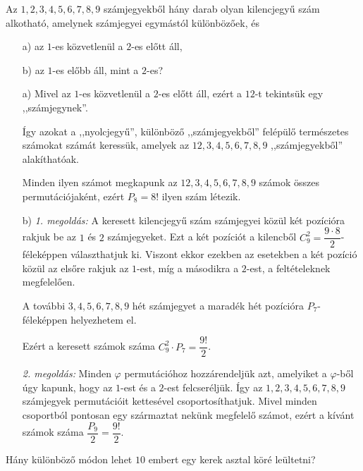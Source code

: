\begin{problem}
\label{fel11} Az $1,2,3,4,5,6,7,8,9$ számjegyekből hány darab olyan
kilencjegyű szám alkotható, amelynek számjegyei egymástól különbözőek,
és 
\begin{enumerate}
\item[a)] az $1$-es közvetlenül a $2$-es előtt áll, 
\item[b)] az $1$-es előbb áll, mint a $2$-es? 
\item[a)] Mivel az $1$-es közvetlenül a $2$-es előtt áll, ezért a $12$-t
tekintsük egy ,,számjegynek''.

Így azokat a ,,nyolcjegyű'', különböző ,,számjegyekből'' felépülő
természetes számokat számát keressük, amelyek az $12,3,4,5,6,7,8,9$
,,számjegyekből'' alakíthatóak.

Minden ilyen számot megkapunk az $12,3,4,5,6,7,8,9$ számok összes
permutációjaként, ezért $P_{8}=8!$ ilyen szám létezik.
\item[b)] \textit{1. megoldás:} A keresett kilencjegyű szám számjegyei közül
két pozícióra rakjuk be az $1$ és $2$ számjegyeket. Ezt a két pozíciót
a kilencből $C_{9}^{2}=\dfrac{9\cdot8}{2}$-féleképpen választhatjuk
ki. Viszont ekkor ezekben az esetekben a két pozíció közül az elsőre
rakjuk az $1$-est, míg a másodikra a $2$-est, a feltételeknek megfelelően.

A további $3,4,5,6,7,8,9$ hét számjegyet a maradék hét pozícióra
$P_{7}$-féleképpen helyezhetem el.

Ezért a keresett számok száma $C_{9}^{2}\cdot P_{7}=\dfrac{9!}{2}$.

\textit{2. megoldás:} Minden $\varphi$ permutációhoz hozzárendeljük
azt, amelyiket a $\varphi$-ből úgy kapunk, hogy az $1$-est és a
$2$-est felcseréljük. Így az $1,2,3,4,5,6,7,8,9$ számjegyek permutációit
kettesével csoportosíthatjuk. Mivel minden csoportból pontosan egy
származtat nekünk megfelelő számot, ezért a kívánt számok száma $\dfrac{P_{9}}{2}=\dfrac{9!}{2}$. 

\end{enumerate}
Hány különböző módon lehet $10$ embert egy kerek asztal köré leültetni? 
\end{problem}

